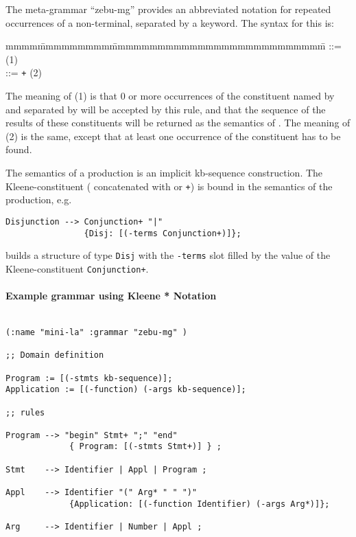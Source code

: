 The meta-grammar ``zebu-mg'' provides an abbreviated notation for
repeated occurrences of a non-terminal, separated by a keyword.  The
syntax for this is:

\begin{tabbing}
mmmm\=mmmmmmmmm\=mmmmmmmmmmmmmmmmmmmmmmmmmmm\=\kill
 \> \> ::=  {\tt *}  \>(1)\\
 \> \> ::=  {\tt +}  \>(2)\\
\end{tabbing}

The meaning of (1) is that 0 or more occurrences of the constituent
named by  and separated by  will
be accepted by this rule, and that the sequence of the results of
these constituents will be returned as the semantics of
.  The meaning of (2) is the same, except that at
least one occurrence of the constituent has to be found.

The semantics of a  production is an implicit
kb-sequence construction. The Kleene-constituent (
concatenated with {\tt *} or {\tt +}) is bound in the semantics of
the production, e.g. 

{\tt \begin{verbatim}
Disjunction --> Conjunction+ "|" 
                {Disj: [(-terms Conjunction+)]};
     \end{verbatim}
}

builds a structure of type {\tt Disj} with the {\tt -terms} slot
filled by the value of the Kleene-constituent {\tt Conjunction+}.

\paragraph {Example grammar using Kleene * Notation} 

{\tt \begin{verbatim}

(:name "mini-la" :grammar "zebu-mg" )

;; Domain definition

Program := [(-stmts kb-sequence)];
Application := [(-function) (-args kb-sequence)];

;; rules

Program --> "begin" Stmt+ ";" "end"
             { Program: [(-stmts Stmt+)] } ;

Stmt    --> Identifier | Appl | Program ;

Appl    --> Identifier "(" Arg* " " ")"
             {Application: [(-function Identifier) (-args Arg*)]};

Arg     --> Identifier | Number | Appl ;
     \end{verbatim}
}

